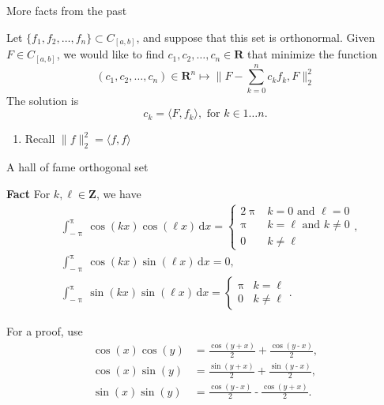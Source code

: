 \documentclass[portrait,fleqn,12pt]{beamer}
\newcommand{\reals}{\mathbf{R}}
\newcommand{\integers}{\mathbf{Z}}
\newenvironment{handlist}
   {\begin{enumerate}[\faHandPointRight]
       \addtolength{\itemsep}{0.0\itemsep}}
     {\end{enumerate}}
\begin{document}
\begin{frame}{More facts from the past}

Let  $\{f_1, f_2, \dots, f_n \} \subset C_{[a,b]}$, and suppose that this set is 
orthonormal. Given $F \in C_{[a,b]}$,
we would like to find $c_1, c_2, \dots, c_n \in \reals$ that minimize the function
\begin{equation}
  (c_1, c_2, \dots, c_n) \in \reals^n \mapsto \| F - \sum_{k=0}^n c_k f_k, F  \|_2^2
 \end{equation}
The solution is
\begin{equation}
   c_k  =  \langle F, f_k \rangle, \text{ for } k \in 1 \dots n.
\end{equation}
\begin{handlist}
\item Recall $\| f \|_2^2 = \langle f, f \rangle$
\end{handlist}
\end{frame}

\begin{frame}{A hall of fame orthogonal set}

\textbf{Fact} For $k, \ell \in \integers$, we have
\begin{align*}
&\int_{-\uppi}^\uppi \cos(k x) \cos(\ell x) \, \mathrm{d} x = \begin{cases} 
  2 \uppi & k=0 \text{ and } \ell = 0 \\
  \uppi & k = \ell \text{ and } k \neq 0 \\ 0  & k \neq  \ell \end{cases},\\
&\int_{-\uppi}^\uppi \cos(k x) \sin(\ell x) \, \mathrm{d} x = 0, \\
&\int_{-\uppi}^\uppi \sin(k x) \sin(\ell x) \, \mathrm{d} x = \begin{cases} \uppi & k = \ell \\ 0  & k \neq  \ell \end{cases}.
\end{align*}


\end{frame}
\begin{frame}{For a proof, use}
  \begin{align*}
    \cos{(x)} \cos{(y)}&\operatorname{=}\frac{\cos{\left( y\operatorname{+}x\right) }}{2}\operatorname{+}\frac{\cos{\left( y\operatorname{-}x\right) }}{2},\\
    \cos{(x)} \sin{(y)}&\operatorname{=}\frac{\sin{\left( y\operatorname{+}x\right) }}{2}\operatorname{+}\frac{\sin{\left( y\operatorname{-}x\right) }}{2},\\
    \sin{(x)} \sin{(y)}&\operatorname{=}\frac{\cos{\left( y\operatorname{-}x\right) }}{2}\operatorname{-}\frac{\cos{\left( y\operatorname{+}x\right) }}{2}.
  \end{align*}
\end{frame}
\end{document}
